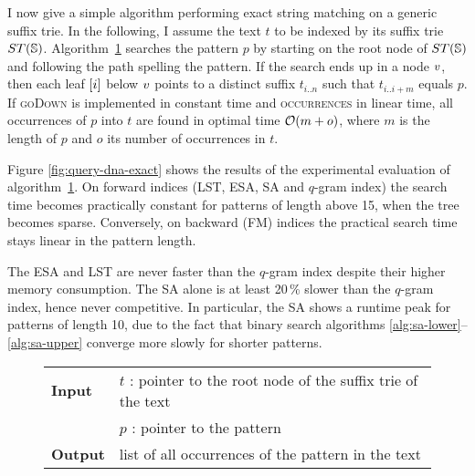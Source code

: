 I now give a simple algorithm performing exact string matching on a generic suffix trie.
In the following, I assume the text $t$ to be indexed by its suffix trie $ST(\mathbb{S})$.
Algorithm~\ref{alg:st-exact} searches the pattern $p$ by starting on the root node of $ST(\mathbb{S})$ and following the path spelling the pattern.
If the search ends up in a node $v$, then each leaf $[i]$ below $v$ points to a distinct suffix $t_{i..n}$ such that $t_{i..i+m}$ equals $p$.
If \textsc{goDown} is implemented in constant time and \textsc{occurrences} in linear time, all occurrences of $p$ into $t$ are found in optimal time $\mathcal{O}(m+o)$, where $m$ is the length of $p$ and $o$ its number of occurrences in $t$.

Figure \ref{fig:query-dna-exact} shows the results of the experimental evaluation of algorithm~\ref{alg:st-exact}.
On forward indices (LST, ESA, SA and $q$-gram index) the search time becomes practically constant for patterns of length above 15, \ie when the tree becomes sparse.
Conversely, on backward (FM) indices the practical search time stays linear in the pattern length. 

The ESA and LST are never faster than the $q$-gram index despite their higher memory consumption.
The SA alone is at least 20\,\% slower than the $q$-gram index, hence never competitive.
In particular, the SA shows a runtime peak for patterns of length 10, due to the fact that binary search algorithms \ref{alg:sa-lower}--\ref{alg:sa-upper} converge more slowly for shorter patterns.

\begin{figure*}[t]
\begin{center}
\begin{minipage}[t]{.8\textwidth}
\begin{algorithm}[H]
\begin{tabular}{ll}
\textbf{Input}  & $t$ : pointer to the root node of the suffix trie of the text\\
				& $p$ : pointer to the pattern\\
\textbf{Output} & list of all occurrences of the pattern in the text\\
\end{tabular}
\begin{algorithmic}[1]
	\State \Report {}
		\State {}
\EndIf
\end{algorithmic}
\label{alg:st-exact}
\end{algorithm}
\end{minipage}
\end{center}
\end{figure*}

